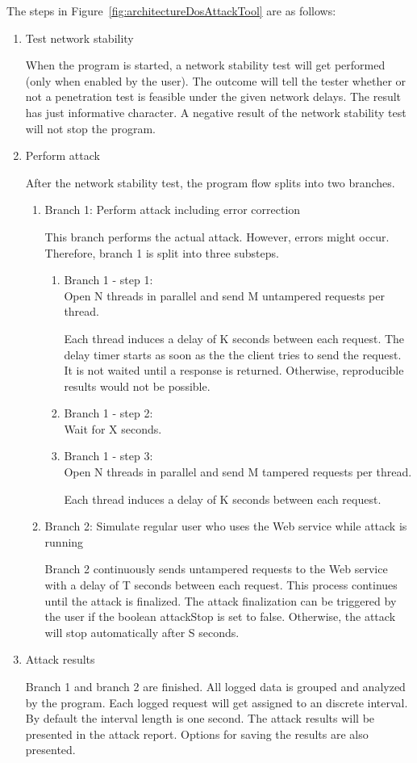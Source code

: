 The steps in Figure~\ref{fig:architectureDosAttackTool} are as follows:
  \begin{enumerate}
    \item Test network stability\par When the program is started, a network stability test will get performed (only when enabled by the user). The outcome will tell the tester whether or not a penetration test is feasible under the given network delays. The result has just informative character. A negative result of the network stability test will not stop the program. 
    \item Perform attack\par After the network stability test, the program flow splits into two branches.  
    \begin{enumerate}
      \item Branch 1: Perform attack including error correction\par This branch performs the actual attack. However, errors might occur. Therefore, branch 1 is split into three substeps.
      \begin{enumerate}
	\item Branch 1 - step 1:\\Open N threads in parallel and send M untampered requests per thread.\par Each thread induces a delay of K seconds between each request. The delay timer starts as soon as the the client tries to send the request. It is not waited until a response is returned. Otherwise, reproducible results would not be possible.
	\item Branch 1 - step 2:\\Wait for X seconds. 
	\item Branch 1 - step 3:\\Open N threads in parallel and send M tampered requests per thread.\par Each thread induces a delay of K seconds between each request.
      \end{enumerate}  
      \item Branch 2: Simulate regular user who uses the Web service while attack is running\par Branch 2 continuously sends untampered requests to the Web service with a delay of T seconds between each request. This process continues until the attack is finalized.  The attack finalization can be triggered by the user if the boolean attackStop is set to false. Otherwise, the attack will stop automatically after S seconds.
    \end{enumerate}
    \item Attack results\par Branch 1 and branch 2 are finished. All logged data is grouped and analyzed by the program. Each logged request will get assigned to an discrete interval. By default the interval length is one second. 
    The attack results will be presented in the attack report. Options for saving the results are also presented.
  \end{enumerate}


